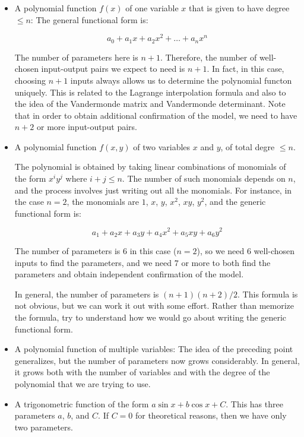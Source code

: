 \documentclass[10pt]{amsart}
\begin{document}
\begin{itemize}
\item A polynomial function $f(x)$ of one variable $x$ that is given
  to have degree $\le n$: The general functional form is:

  $$a_0 + a_1x + a_2x^2 + \dots + a_nx^n$$

  The number of parameters here is $n + 1$. Therefore, the number of
  well-chosen input-output pairs we expect to need is $n + 1$. In
  fact, in this case, choosing $n + 1$ inputs always allows us to
  determine the polynomial functon uniquely. This is related to the
  Lagrange interpolation formula and also to the idea of the
  Vandermonde matrix and Vandermonde determinant. Note that in order
  to obtain additional confirmation of the model, we need to have $n +
  2$ or more input-output pairs.

\item A polynomial function $f(x,y)$ of two variables $x$ and $y$, of
  total degre $\le n$.

  The polynomial is obtained by taking linear combinations of
  monomials of the form $x^iy^j$ where $i + j \le n$. The number of
  such monomials depends on $n$, and the process involves just writing
  out all the monomials. For instance, in the case $n = 2$, the
  monomials are $1$, $x$, $y$, $x^2$, $xy$, $y^2$, and the generic
  functional form is:

  $$a_1 + a_2x + a_3y + a_4x^2 + a_5xy + a_6y^2$$

  The number of parameters is $6$ in this case ($n = 2$), so we need
  $6$ well-chosen inputs to find the parameters, and we need $7$ or
  more to both find the parameters and obtain independent confirmation
  of the model.

  In general, the number of parameters is $(n+1)(n+2)/2$. This formula
  is not obvious, but we can work it out with some effort. Rather than
  memorize the formula, try to understand how we would go about writing
  the generic functional form.

\item A polynomial function of multiple variables: The idea of the
  preceding point generalizes, but the number of parameters now grows
  considerably. In general, it grows both with the number of variables
  and with the degree of the polynomial that we are trying to use.

\item A trigonometric function of the form $a \sin x + b \cos x +
  C$. This has three parameters $a$, $b$, and $C$. If $C = 0$ for
  theoretical reasons, then we have only two parameters.


\end{itemize}
\end{document}
